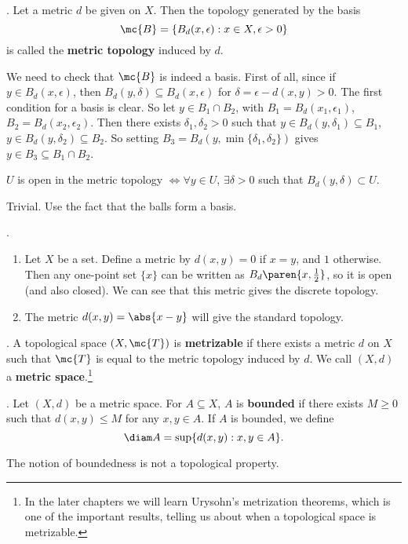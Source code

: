.  Let a metric \(d\) be given on \(X\). Then the topology generated by the basis
\[
    \mc{B} = \{B_d(x, \epsilon) : x\in X, \epsilon > 0\}
\]
is called the \textbf{metric topology} induced by \(d\).

We need to check that \(\mc{B}\) is indeed a basis. First of all, since if \(y \in B_d(x, \epsilon)\), then \(B_d(y, \delta) \subseteq B_d(x, \epsilon)\) for \(\delta = \epsilon - d(x, y) > 0\). The first condition for a basis is clear. So let \(y \in B_1\cap B_2\), with \(B_1 = B_d(x_1, \epsilon_1)\), \(B_2 = B_d(x_2, \epsilon_2)\). Then there exists \(\delta_1, \delta_2 > 0\) such that \(y \in B_d(y, \delta_1) \subseteq B_1\), \(y \in B_d(y, \delta_2) \subseteq B_2\). So setting \(B_3 = B_d(y, \min\{\delta_1, \delta_2\})\) gives \(y \in B_3 \subseteq B_1 \cap B_2\).

\rmk \(U\) is open in the metric topology \(\iff \forall y \in U\), \(\exists \delta > 0\) such that \(B_d(y, \delta) \subset U\).

\pf \note{\mimpd} Trivial. \note{\mimp} Use the fact that the balls form a basis.

\ex.
\begin{enumerate}
    \item Let \(X\) be a set. Define a metric by \(d(x, y) = 0\) if \(x = y\), and \(1\) otherwise. Then any one-point set \(\{x\}\) can be written as \(B_d\paren{x, \frac{1}{2}}\), so it is open (and also closed). We can see that this metric gives the discrete topology.
    \item The metric \(d(x, y) = \abs{x - y}\) will give the standard topology.
\end{enumerate}

. A topological space \((X, \mc{T})\) is \textbf{metrizable} if there exists a metric \(d\) on \(X\) such that \(\mc{T}\) is equal to the metric topology induced by \(d\). We call \((X, d)\) a \textbf{metric space}.\footnote{In the later chapters we will learn Urysohn's metrization theorems, which is one of the important results, telling us about when a topological space is metrizable.}

. Let \((X, d)\) be a metric space. For \(A \subseteq X\), \(A\) is \textbf{bounded} if there exists \(M \geq 0 \) such that \(d(x, y) \leq M\) for any \(x, y \in A\). If \(A\) is bounded, we define
\[
    \diam A = \sup\{d(x, y) : x, y \in A\}.
\]

The notion of boundedness is not a topological property.

